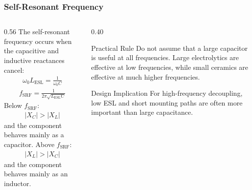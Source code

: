 \begin{frame}
\frametitle{Self-Resonant Frequency}
\begin{columns}
\begin{column}{0.56\textwidth}
The self-resonant frequency occurs when the capacitive and inductive reactances cancel:
\begin{align}
    \omega_0 L_{\mathrm{ESL}}
    =
    \frac{1}{\omega_0 C}
\end{align}
\begin{align}
    f_{\mathrm{SRF}}
    =
    \frac{1}{2\pi\sqrt{L_{\mathrm{ESL}}C}}
\end{align}
Below $f_{\mathrm{SRF}}$:
\begin{align}
    |X_C| > |X_L|
\end{align}
and the component behaves mainly as a capacitor. Above $f_{\mathrm{SRF}}$:
\begin{align}
    |X_L| > |X_C|
\end{align}
and the component behaves mainly as an inductor.
\end{column}

\begin{column}{0.40\textwidth}
\begin{block}{Practical Rule}
Do not assume that a large capacitor is useful at all frequencies. Large electrolytics are effective at low frequencies, while small ceramics are effective at much higher frequencies.
\end{block}
\begin{block}{Design Implication}
For high-frequency decoupling, low ESL and short mounting paths are often more important than large capacitance.
\end{block}
\end{column}
\end{columns}
\end{frame}


